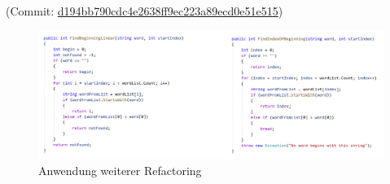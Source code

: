 (Commit: \href{https://github.com/EinToni/Wortfinder/commit/d194bb790cdc4e2638ff9ec223a89ecd0e51e515}{d194bb790cdc4e2638ff9ec223a89ecd0e51e515})

\begin{figure}[htb]
\centering
\includegraphics[width=\textwidth]{Bilder/Refactorings.PNG}
\caption{\label{Abb:Refactorings}Anwendung weiterer Refactoring}
\end{figure}



\endinput